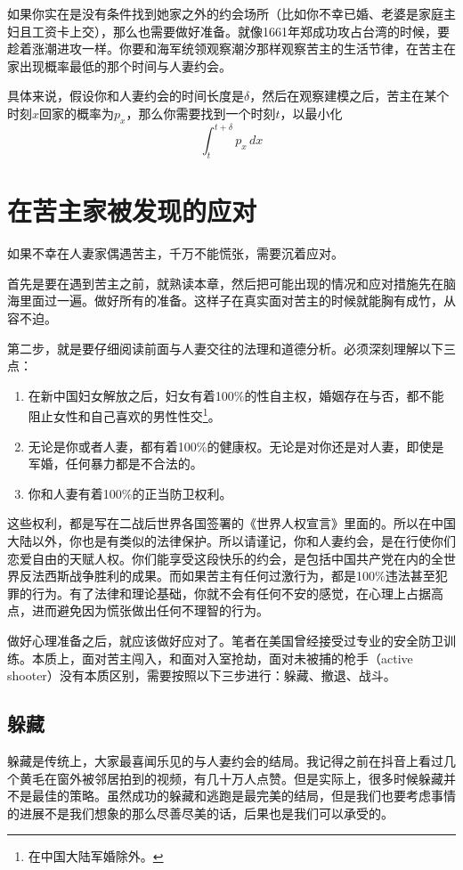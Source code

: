 如果你实在是没有条件找到她家之外的约会场所（比如你不幸已婚、老婆是家庭主妇且工资卡上交），那么也需要做好准备。就像1661年郑成功攻占台湾的时候，要趁着涨潮进攻一样。你要和海军统领观察潮汐那样观察苦主的生活节律，在苦主在家出现概率最低的那个时间与人妻约会。

具体来说，假设你和人妻约会的时间长度是$\delta$，然后在观察建模之后，苦主在某个时刻$x$回家的概率为$p_x$，那么你需要找到一个时刻$t$，以最小化$$\int_{t}^{t+\delta}p_x \,dx$$

\section{在苦主家被发现的应对}

如果不幸在人妻家偶遇苦主，千万不能慌张，需要沉着应对。

首先是要在遇到苦主之前，就熟读本章，然后把可能出现的情况和应对措施先在脑海里面过一遍。做好所有的准备。这样子在真实面对苦主的时候就能胸有成竹，从容不迫。

第二步，就是要仔细阅读前面与人妻交往的法理和道德分析。必须深刻理解以下三点：
\begin{enumerate}
\item 在新中国妇女解放之后，妇女有着100\%的性自主权，婚姻存在与否，都不能阻止女性和自己喜欢的男性性交\footnote{在中国大陆军婚除外。}。
\item 无论是你或者人妻，都有着100\%的健康权。无论是对你还是对人妻，即使是军婚，任何暴力都是不合法的。
\item 你和人妻有着100\%的正当防卫权利。
\end{enumerate}

这些权利，都是写在二战后世界各国签署的《世界人权宣言》里面的。所以在中国大陆以外，你也是有类似的法律保护。所以请谨记，你和人妻约会，是在行使你们恋爱自由的天赋人权。你们能享受这段快乐的约会，是包括中国共产党在内的全世界反法西斯战争胜利的成果。而如果苦主有任何过激行为，都是100\%违法甚至犯罪的行为。有了法律和理论基础，你就不会有任何不安的感觉，在心理上占据高点，进而避免因为慌张做出任何不理智的行为。

做好心理准备之后，就应该做好应对了。笔者在美国曾经接受过专业的安全防卫训练。本质上，面对苦主闯入，和面对入室抢劫，面对未被捕的枪手（active shooter）没有本质区别，需要按照以下三步进行：躲藏、撤退、战斗。

\subsection{躲藏}

躲藏是传统上，大家最喜闻乐见的与人妻约会的结局。我记得之前在抖音上看过几个黄毛在窗外被邻居拍到的视频，有几十万人点赞。但是实际上，很多时候躲藏并不是最佳的策略。虽然成功的躲藏和逃跑是最完美的结局，但是我们也要考虑事情的进展不是我们想象的那么尽善尽美的话，后果也是我们可以承受的。


